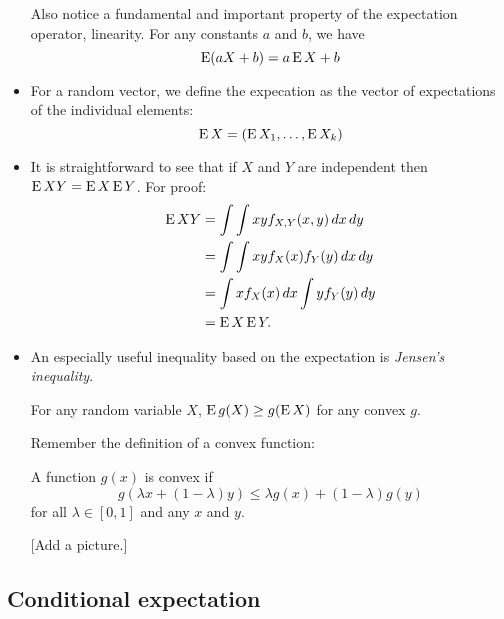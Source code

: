 \begin{itemize}[leftmargin=0pt]
  Also notice a fundamental and important property of the expectation
  operator, linearity.  For any constants $a$ and $b$, we have
  \begin{equation*}
    \operatorname{E}(a X + b) = a \operatorname{E} X + b
  \end{equation*}

\item For a random vector, we define the expecation as the vector of
  expectations of the individual elements:
  \begin{equation*}
    \operatorname{E} X = (\operatorname{E} X_1,\dots,\operatorname{E} X_k)
  \end{equation*}

\item It is straightforward to see that if $X$ and $Y$ are
  independent then $\operatorname{E} XY = \operatorname{E} X \operatorname{E} Y$.  For proof:
  \begin{align*}
    \operatorname{E} XY
    &= \int\int x y f_{X,Y}(x,y) \,dx \,dy \\
    &= \int\int xy f_X(x) f_Y(y) \,dx \,dy \\
    &= \int x f_X(x) \,dx \int y f_Y(y) \,dy \\
    &= \operatorname{E} X \operatorname{E} Y.
  \end{align*}

\item An especially useful inequality based on the expectation is
  \emph{Jensen's inequality}.
  \begin{thm}
    For any random variable $X$, $\operatorname{E} g(X) \geq g(\operatorname{E} X)$ for any convex
    $g$.
  \end{thm}

  Remember the definition of a convex function:
  \begin{defn}
    A function $g(x)$ is convex if 
    \begin{equation*}
      g( \lambda x + (1-\lambda) y ) \leq \lambda g(x) + (1-\lambda) g(y) 
    \end{equation*}
    for all $\lambda \in [0,1]$ and any $x$ and $y$.
  \end{defn}

  [Add a picture.]

\end{itemize}

\subsection{Conditional expectation}

